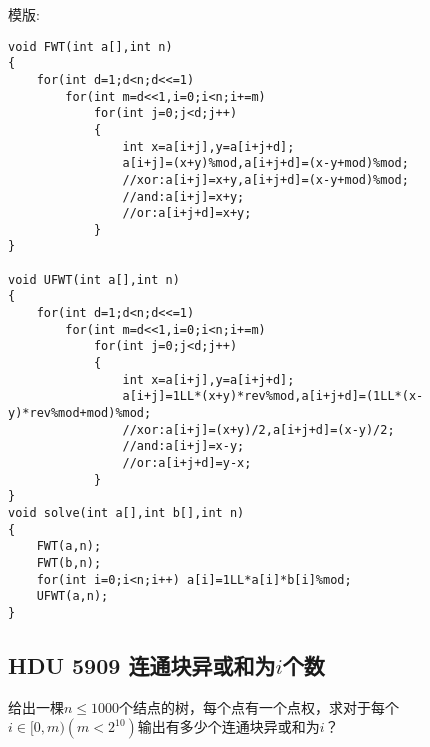 模版:
\begin{lstlisting}
void FWT(int a[],int n)
{
    for(int d=1;d<n;d<<=1)
        for(int m=d<<1,i=0;i<n;i+=m)
            for(int j=0;j<d;j++)
            {
                int x=a[i+j],y=a[i+j+d];
                a[i+j]=(x+y)%mod,a[i+j+d]=(x-y+mod)%mod;
                //xor:a[i+j]=x+y,a[i+j+d]=(x-y+mod)%mod;
                //and:a[i+j]=x+y;
                //or:a[i+j+d]=x+y;
            }
}

void UFWT(int a[],int n)
{
    for(int d=1;d<n;d<<=1)
        for(int m=d<<1,i=0;i<n;i+=m)
            for(int j=0;j<d;j++)
            {
                int x=a[i+j],y=a[i+j+d];
                a[i+j]=1LL*(x+y)*rev%mod,a[i+j+d]=(1LL*(x-y)*rev%mod+mod)%mod;
                //xor:a[i+j]=(x+y)/2,a[i+j+d]=(x-y)/2;
                //and:a[i+j]=x-y;
                //or:a[i+j+d]=y-x;
            }
}
void solve(int a[],int b[],int n)
{
    FWT(a,n);
    FWT(b,n);
    for(int i=0;i<n;i++) a[i]=1LL*a[i]*b[i]%mod;
    UFWT(a,n);
}
\end{lstlisting}
\subsection{HDU 5909  连通块异或和为$i$个数}
给出一棵$n\leq 1000$个结点的树，每个点有一个点权，求对于每个$i\in [0,m)(m < 2^{10})$输出有多少个连通块异或和为$i$？ \\

